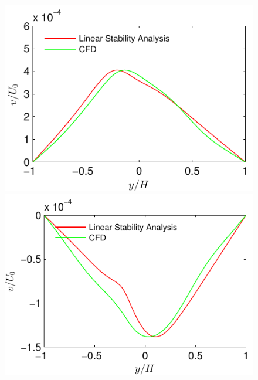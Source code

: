 \documentclass[12pt]{report}   %
\begin{document}
\begin{figure}
\centerline{\includegraphics{LinearStabilityVsCFD_Saturated_v_phase0} \includegraphics{LinearStabilityVsCFD_Saturated_v_phase90}}

\end{figure}
\end{document}
